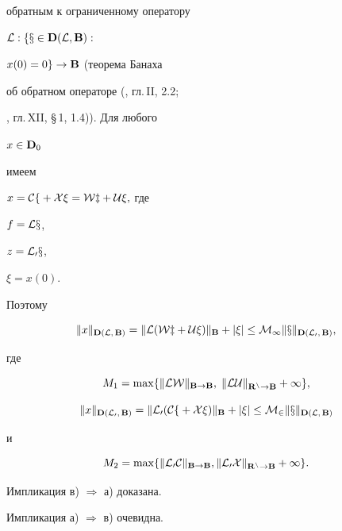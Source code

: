 \begin{pf}
обратным к ограниченному оператору


$\cal L:\{x\in\bold D(\cal L,\bold B):$\linebreak




$x(0)=0\}\to\bold B$ (теорема Банаха


об обратном операторе (\cite{Dun}, гл.\,II, 2.2;


\cite{Kant2}, гл.\,XII, \S\,1, 1.4)). Для любого


$x\in\bold D_0$


имеем


$x = \cal C f + \cal X\xi = \cal W z + \cal U\xi,$ где


$f =\cal Lx$,


$z = \cal L_0 x$,


$\xi = x(0).$


Поэтому


$$


\|x\|_{\bold D(\cal L,\,\bold B)} =


\|\cal L(\cal W z + \cal U\xi)\|_{\bold B}


+ | \xi| \le M_1 \|x\|_{\bold D(\cal L_0,\, \bold B)},


$$


где


$$


M_1 = \max\{\|\cal L\cal W\|_{\bold B\to\bold B},\;


\|\cal L\cal U\|_{\bold R^n\to\bold B} + 1\},


$$


%


$$


\| x\|_{\bold D(\cal L_0,\,\bold B)} =


\|\cal L_0(\cal C f+\cal X\xi)\|_{\bold B}


+|\xi|\le M_2 \|x\|_{\bold D(\cal L,\,\bold B)}


$$


и


$$


M_2 = \max\{\|\cal L_0 \cal C\|_{\bold B\to\bold B},


\|\cal L_0 \cal X\|_{\bold R^n\to\bold B} +1\}.


$$


Импликация в) $\Rightarrow$ а) доказана.





Импликация а) $\Rightarrow$ в) очевидна.


\end{pf}





